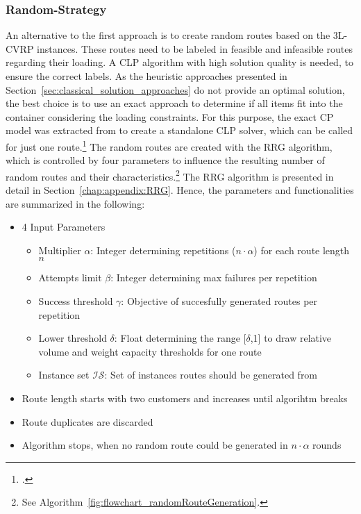 \subsubsection{Random-Strategy}
An alternative to the first approach is to create random routes based on the \gls{3L-CVRP} instances.
These routes need to be labeled in feasible and infeasible routes regarding their loading.
A \gls{CLP} algorithm with high solution quality is needed, to ensure the correct labels. As the heuristic approaches
presented in Section~\ref{sec:classical_solution_approaches} do not provide an optimal solution,
the best choice is to use an exact approach to determine if all items fit into the container considering the loading constraints.
For this purpose, the exact \gls{CP} model was extracted from \cite{tamke_repository_2024} to create
a standalone \gls{CLP} solver, which can be called for just one route.\footcite[cf.][]{tamke_repository_2024}
The random routes are created with the \gls{RRG} algorithm, which is controlled by four parameters to
influence the resulting number of random routes and their characteristics.\footnote{See Algorithm~\ref{fig:flowchart_randomRouteGeneration}.}
The \gls{RRG} algorithm is presented in detail in Section~\ref{chap:appendix:RRG}.
Hence, the parameters and functionalities are summarized in the following:
\begin{itemize}
	\item 4 Input Parameters
	      \begin{itemize}
		      \item Multiplier $\alpha$: Integer determining repetitions ($n\cdot\alpha$) for each route length $n$
		      \item  Attempts limit $\beta$: Integer determining max failures per repetition
		      \item  Success threshold $\gamma$: Objective of succesfully generated routes per repetition
		      \item  Lower threshold $\delta$: Float determining the range [$\delta$,1] to draw relative volume and weight capacity thresholds for one route
		      \item Instance set $\mathcal{IS}$: Set of instances routes should be generated from
	      \end{itemize}
	\item Route length starts with two customers and increases until algorihtm breaks
	\item Route duplicates are discarded
	\item Algorithm stops, when no random route could be generated in $n \cdot \alpha$ rounds
\end{itemize}

